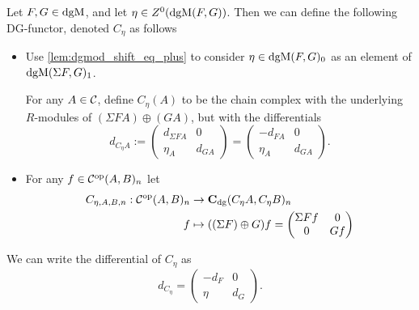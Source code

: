 \begin{definition}
    \label{def:dgm_cone}
    Let \( F, G \in \operatorname{dgM} \), and let \( \eta \in Z^0(\operatorname{dgM}(F, G)) \). Then we can define the following DG-functor, denoted \( C_{\eta} \) as follows
    \begin{itemize}
        \item {
            Use \autoref{lem:dgmod_shift_eq_plus} to consider \( \eta \in \operatorname{dgM}(F, G)_0 \) as an element of \( \operatorname{dgM}(\Sigma F, G)_1 \).

            For any \( A \in {\mathcal{C}} \), define \( C_{\eta}(A) \) to be the chain complex with the underlying \( R \)-modules of \( (\Sigma F A) \oplus (G A) \), but with the differentials
            \[
                d_{C_{\eta}A} :=
                \begin{pmatrix}
                    d_{\Sigma F A} & 0 \\
                    \eta_A & d_{GA}
                \end{pmatrix}
                =
                \begin{pmatrix}
                    -d_{F A} & 0 \\
                    \eta_A & d_{GA}
                \end{pmatrix}.
            \]
        }
        \item {
            For any \( f \in {\mathcal{C}}^{\operatorname{op}}(A, B)_n \) let
            \begin{align*}
                C_{\eta, A, B, n}: {\mathcal{C}}^{\operatorname{op}}(A, B)_n &\to \operatorname{\mathbf{C}}_{\operatorname{dg}}(C_{\eta} A, C_{\eta} B)_n \\
                f &\mapsto ((\Sigma F) \oplus G) f = 
                \begin{pmatrix}
                    \Sigma F f & 0 \\
                    0 & G f
                \end{pmatrix}
            \end{align*}
        }
    \end{itemize}
\end{definition}

We can write the differential of \( C_{\eta} \) as
\[
    d_{C_{\eta}} =
    \begin{pmatrix}
        -d_F & 0 \\
        \eta & d_G
    \end{pmatrix}.
\]

